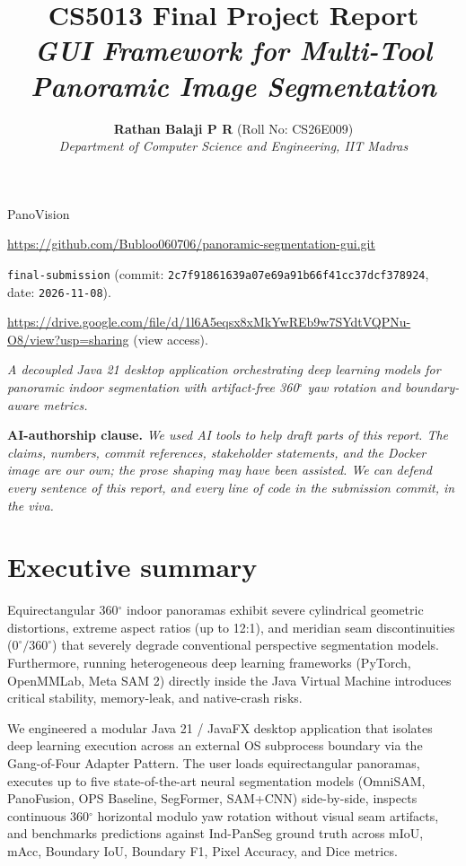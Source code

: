 \documentclass[10pt,a4paper]{article}
\title{\vspace{-1.4em}\textbf{\large CS5013 Final Project Report} \\
       \normalsize\textit{GUI Framework for Multi-Tool Panoramic Image Segmentation}\vspace{-0.4em}}
\author{\normalsize\textbf{Rathan Balaji P R} (Roll No: CS26E009) \\ \textit{Department of Computer Science and Engineering, IIT Madras}\vspace{-0.9em}}
\date{}
\begin{document}
\maketitle

\vspace{-1.6em}

\begin{description}[leftmargin=!,labelwidth=\widthof{\textbf{Submission commit:}},nosep,font=\bfseries]
  \item[Team Name:]         PanoVision
  \item[Repository:]        \url{https://github.com/Bubloo060706/panoramic-segmentation-gui.git}
  \item[Submission commit:] \texttt{final-submission} (commit: \texttt{2c7f91861639a07e69a91b66f41cc37dcf378924}, date: \texttt{2026-11-08}).
  \item[Docker image:]      \url{https://drive.google.com/file/d/1l6A5eqsx8xMkYwREb9w7SYdtVQPNu-O8/view?usp=sharing} (view access).
  \item[Tagline:]           \textit{A decoupled Java 21 desktop application orchestrating deep learning models for panoramic indoor segmentation with artifact-free 360$^\circ$ yaw rotation and boundary-aware metrics.}
\end{description}

\vspace{0.35em}
\noindent\textbf{AI-authorship clause.}
\textit{%
We used AI tools to help draft parts of this report. The claims,
numbers, commit references, stakeholder statements, and the Docker
image are our own; the prose shaping may have been assisted. We can
defend every sentence of this report, and every line of code in the
submission commit, in the viva.%
}

\section{Executive summary}
Equirectangular 360$^\circ$ indoor panoramas exhibit severe cylindrical geometric distortions, extreme aspect ratios (up to 12:1), and meridian seam discontinuities ($0^\circ/360^\circ$) that severely degrade conventional perspective segmentation models. Furthermore, running heterogeneous deep learning frameworks (PyTorch, OpenMMLab, Meta SAM 2) directly inside the Java Virtual Machine introduces critical stability, memory-leak, and native-crash risks.

We engineered a modular Java 21 / JavaFX desktop application that isolates deep learning execution across an external OS subprocess boundary via the Gang-of-Four Adapter Pattern. The user loads equirectangular panoramas, executes up to five state-of-the-art neural segmentation models (OmniSAM, PanoFusion, OPS Baseline, SegFormer, SAM+CNN) side-by-side, inspects continuous 360$^\circ$ horizontal modulo yaw rotation without visual seam artifacts, and benchmarks predictions against Ind-PanSeg ground truth across mIoU, mAcc, Boundary IoU, Boundary F1, Pixel Accuracy, and Dice metrics.
\end{document}
